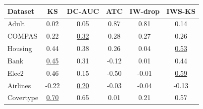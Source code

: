 \begin{tabular}{lccccc}
\toprule
Dataset & KS & DC-AUC & ATC & IW-drop & IWS-KS \\
\midrule
Adult & 0.02 & 0.05 & \underline{0.87} & 0.81 & 0.14 \\
COMPAS & 0.22 & \underline{0.32} & 0.28 & 0.27 & 0.26 \\
Housing & 0.44 & 0.38 & 0.26 & 0.04 & \underline{0.53} \\
Bank & \underline{0.45} & 0.31 & -0.12 & 0.01 & 0.44 \\
Elec2 & 0.46 & 0.15 & -0.50 & -0.01 & \underline{0.59} \\
Airlines & -0.22 & \underline{0.20} & -0.03 & -0.04 & -0.13 \\
Covertype & \underline{0.70} & 0.65 & 0.01 & 0.21 & 0.57 \\
\bottomrule
\end{tabular}